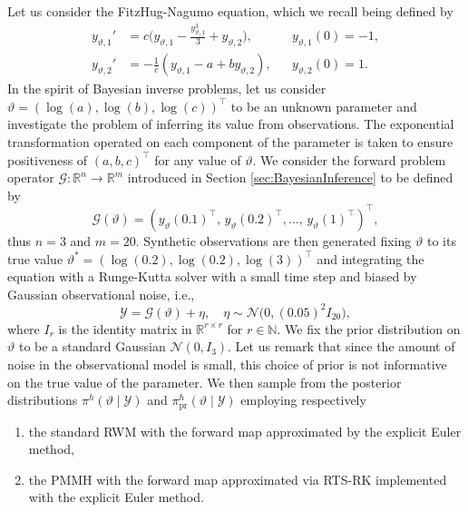 \documentclass{siamart1116}
\numberwithin{theorem}{section}
\renewcommand{\theta}{\vartheta}
\newcommand{\N}{\mathbb{N}}
\newcommand{\R}{\mathbb{R}}
\begin{document}
Let us consider the FitzHug-Nagumo equation, which we recall being defined by
\begin{equation}
\begin{aligned}
y_{\theta, 1}' &= c\big(y_{\theta, 1} - \frac{y_{\theta, 1}^3}{3} + y_{\theta, 2}\big), && y_{\theta, 1}(0) = -1, \\
y_{\theta, 2}' &= -\frac{1}{c}(y_{\theta, 1} - a + b y_{\theta, 2}), && y_{\theta, 2}(0) = 1.
\end{aligned}
\end{equation}
In the spirit of Bayesian inverse problems, let us consider $\theta = (\log(a), \log(b), \log(c))^\top$ to be an unknown parameter and investigate the problem of inferring its value from observations. The exponential transformation operated on each component of the parameter is taken to ensure positiveness of $(a, b, c)^\top$ for any value of $\theta$.  We consider the forward problem operator $\mathcal{G} \colon \R^n \to \R^m$ introduced in Section \ref{sec:BayesianInference} to be defined by
\begin{equation}
	\mathcal{G}(\theta) = (y_\theta(0.1)^\top,\, y_\theta(0.2)^\top, \ldots,\, y_\theta(1)^\top)^\top,
\end{equation} 
thus $n = 3$ and $m = 20$. Synthetic observations are then generated fixing $\theta$ to its true value $\theta^* = (\log(0.2), \log(0.2), \log(3))^\top$ and integrating the equation with a Runge-Kutta solver with a small time step and biased by Gaussian observational noise, i.e.,
\begin{equation}
	\mathcal{Y} = \mathcal{G}(\theta) + \eta, \quad \eta \sim \mathcal{N}\big(0, (0.05)^2 I_{20}\big),
\end{equation}
where $I_{r}$ is the identity matrix in $\R^{r\times r}$ for $r\in\N$. We fix the prior distribution on $\theta$ to be a standard Gaussian $\mathcal{N}(0, I_3)$. Let us remark that since the amount of noise in the observational model is small, this choice of prior is not informative on the true value of the parameter. We then sample from the posterior distributions $\pi^h(\theta \mid \mathcal Y)$ and $\pi^h_{\mathrm{pr}}(\theta \mid \mathcal Y)$ employing respectively
\begin{enumerate}
	 \item the standard RWM with the forward map approximated by the explicit Euler method,
	 \item the PMMH with the forward map approximated via RTS-RK implemented with the explicit Euler method.
\end{enumerate}
\end{document}
